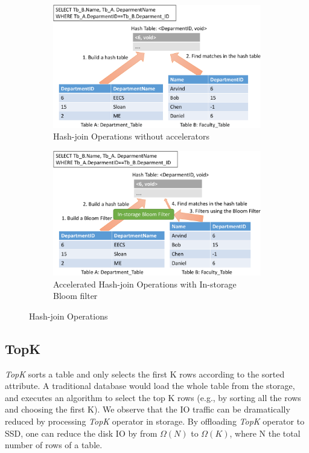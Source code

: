 \documentclass{article}
\newcommand{\topk}{\textit{TopK}\xspace}
\begin{document}
\begin{figure}[!htb]
  \centering
  \begin{subfigure}[t]{0.48\textwidth}
    \includegraphics[width=\textwidth]{figures/hash-join-crop.pdf}
      \caption{Hash-join Operations without accelerators}
      \label{fig:hash-join}
  \end{subfigure}
  \begin{subfigure}[t]{0.48\textwidth}
    \includegraphics[width=\textwidth]{figures/filter-hash-join-crop.pdf}
    \caption{Accelerated Hash-join Operations with In-storage Bloom filter}
    \label{fig:filter-hash-join}
  \end{subfigure}
  \label{fig:try}
  \caption{Hash-join Operations}
\end{figure}

\subsection{TopK}

\topk sorts a table and only selects the first K rows according to the sorted attribute.
A traditional database would load the whole table from the storage, and executes an algorithm to select the top K rows (e.g., by sorting all the rows and choosing the first K). 
We observe that the IO traffic can be dramatically reduced by processing \topk operator in storage.
By offloading \topk operator to SSD, one can reduce the disk IO by from $\Omega(N)$ to $\Omega(K)$, where N the total number of rows of a table.
\end{document}
